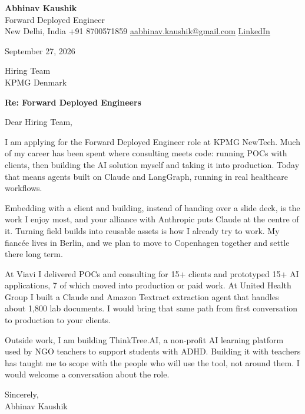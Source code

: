 \documentclass[11pt,a4paper]{article}
\begin{document}
{\Large\bfseries Abhinav Kaushik}\\
Forward Deployed Engineer\\
New Delhi, India \textbar{} +91 8700571859 \textbar{} \href{mailto:aabhinav.kaushik@gmail.com}{aabhinav.kaushik@gmail.com} \textbar{} \href{https://www.linkedin.com/in/abhinav-kaushik10/}{LinkedIn}  

September 27, 2026

Hiring Team\\
KPMG Denmark

\textbf{Re: Forward Deployed Engineers}

Dear Hiring Team,

I am applying for the Forward Deployed Engineer role at KPMG NewTech. Much of my career has been spent where consulting meets code: running POCs with clients, then building the AI solution myself and taking it into production. Today that means agents built on Claude and LangGraph, running in real healthcare workflows.

Embedding with a client and building, instead of handing over a slide deck, is the work I enjoy most, and your alliance with Anthropic puts Claude at the centre of it. Turning field builds into reusable assets is how I already try to work. My fiancée lives in Berlin, and we plan to move to Copenhagen together and settle there long term.

At Viavi I delivered POCs and consulting for 15+ clients and prototyped 15+ AI applications, 7 of which moved into production or paid work. At United Health Group I built a Claude and Amazon Textract extraction agent that handles about 1,800 lab documents. I would bring that same path from first conversation to production to your clients.

Outside work, I am building ThinkTree.AI, a non-profit AI learning platform used by NGO teachers to support students with ADHD. Building it with teachers has taught me to scope with the people who will use the tool, not around them. I would welcome a conversation about the role.

Sincerely,\\[4pt]
Abhinav Kaushik
\end{document}
